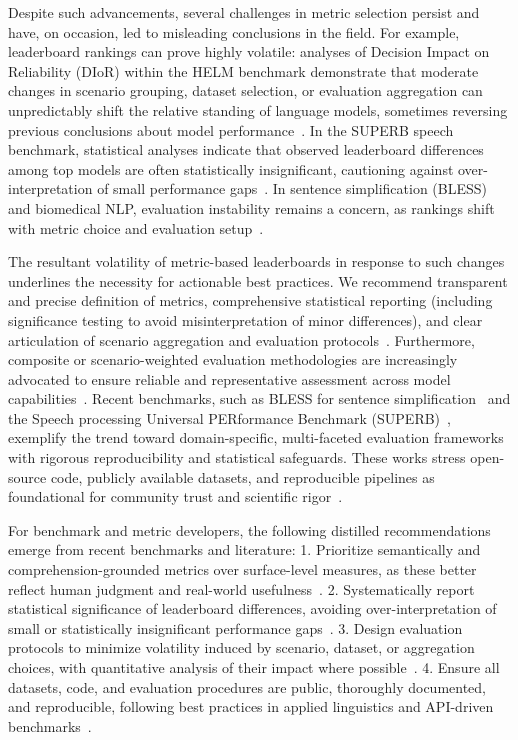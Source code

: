 \documentclass[sigconf]{acmart}
\begin{document}
Despite such advancements, several challenges in metric selection persist and have, on occasion, led to misleading conclusions in the field. For example, leaderboard rankings can prove highly volatile: analyses of Decision Impact on Reliability (DIoR) within the HELM benchmark demonstrate that moderate changes in scenario grouping, dataset selection, or evaluation aggregation can unpredictably shift the relative standing of language models, sometimes reversing previous conclusions about model performance~\cite{ref104}. In the SUPERB speech benchmark, statistical analyses indicate that observed leaderboard differences among top models are often statistically insignificant, cautioning against over-interpretation of small performance gaps~\cite{ref101}. In sentence simplification (BLESS) and biomedical NLP, evaluation instability remains a concern, as rankings shift with metric choice and evaluation setup~\cite{ref94,ref106}.

The resultant volatility of metric-based leaderboards in response to such changes underlines the necessity for actionable best practices. We recommend transparent and precise definition of metrics, comprehensive statistical reporting (including significance testing to avoid misinterpretation of minor differences), and clear articulation of scenario aggregation and evaluation protocols~\cite{ref101,ref104,ref108}. Furthermore, composite or scenario-weighted evaluation methodologies are increasingly advocated to ensure reliable and representative assessment across model capabilities~\cite{ref104,ref106,ref108}. Recent benchmarks, such as BLESS for sentence simplification~\cite{ref106} and the Speech processing Universal PERformance Benchmark (SUPERB)~\cite{ref101}, exemplify the trend toward domain-specific, multi-faceted evaluation frameworks with rigorous reproducibility and statistical safeguards. These works stress open-source code, publicly available datasets, and reproducible pipelines as foundational for community trust and scientific rigor~\cite{ref101,ref106,ref108}.

For benchmark and metric developers, the following distilled recommendations emerge from recent benchmarks and literature:
1. Prioritize semantically and comprehension-grounded metrics over surface-level measures, as these better reflect human judgment and real-world usefulness~\cite{ref76,ref81,ref91,ref94,ref106}.
2. Systematically report statistical significance of leaderboard differences, avoiding over-interpretation of small or statistically insignificant performance gaps~\cite{ref101,ref104}.
3. Design evaluation protocols to minimize volatility induced by scenario, dataset, or aggregation choices, with quantitative analysis of their impact where possible~\cite{ref104,ref106}.
4. Ensure all datasets, code, and evaluation procedures are public, thoroughly documented, and reproducible, following best practices in applied linguistics and API-driven benchmarks~\cite{ref101,ref106,ref108}.
\end{document}
